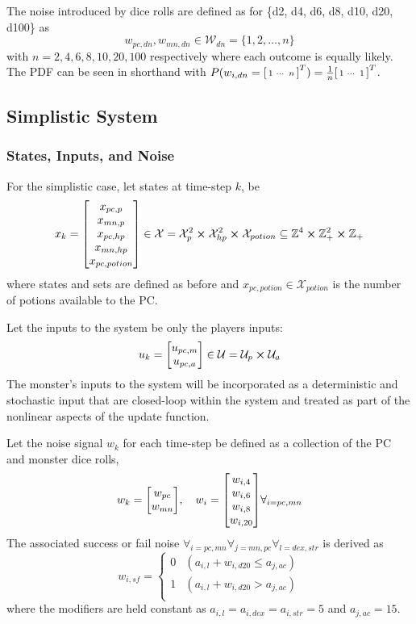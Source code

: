 \documentclass[letterpaper, 10 pt, conference]{ieeeconf}
\newcommand{\Z}{\mathbb{Z}}
\begin{document}
The noise introduced by dice rolls are defined as for \{d2, d4, d6, d8, d10, d20, d100\} as 
\[
    w_{pc,dn}, w_{mn,dn} \in \mathcal{W}_{dn} = \{1,2,\dots,n\}
\] with $n = 2,4,6,8,10,20,100$ respectively where each outcome is equally likely.
The PDF can be seen in shorthand with $P(w_{i,dn} = \smqty[1 & \cdots & n]^T) = \frac{1}{n}\smqty[1 & \cdots & 1]^T$.
% 
\subsection{Simplistic System}
\subsubsection{States, Inputs, and Noise}
For the simplistic case, let states at time-step $k$, be \[
    x_k = \mqty[x_{pc,p}\\x_{mn,p}\\x_{pc,hp}\\x_{mn,hp}\\ x_{pc,potion}] 
    \in \mathcal{X} = \mathcal{X}_p^2 \cross \mathcal{X}_{hp}^2 \cross \mathcal{X}_{potion}
    \subseteq \Z^{4} \cross \Z_{+}^{2} \cross \Z_{+}
\] where states and sets are defined as before and $x_{pc,potion} \in \mathcal{X}_{potion}$ is the number of potions available to the PC.

Let the inputs to the system be only the players inputs: \[
    u_k = \mqty[u_{pc,m}\\u_{pc,a}] \in \mathcal{U} = \mathcal{U}_{p} \cross \mathcal{U}_{a} %
\] The monster's inputs to the system will be incorporated as a deterministic and stochastic input that are closed-loop within the system and treated as part of the nonlinear aspects of the update function.

Let the noise signal $w_k$ for each time-step be defined as a collection of the PC and monster dice rolls, \[
    w_k = \mqty[w_{pc} \\ w_{mn}], \quad w_{i} = \mqty[w_{i,4} \\ w_{i,6} \\ w_{i,8} \\ w_{i,20}] \forall_{i = pc,mn}
\]
The associated success or fail noise $\forall_{i=pc,mn} \forall_{j=mn,pc} \forall_{l = dex,str}$ is derived as \[
    w_{i,sf} = \begin{cases}
        0 & (a_{i,l} + w_{i,d20} \leq a_{j,ac})\\
        1 & (a_{i,l} + w_{i,d20} > a_{j,ac})\\
    \end{cases}
\] where the modifiers are held constant as $a_{i,l} = a_{i,dex} = a_{i,str} = 5$ and $a_{j,ac} = 15$.
\end{document}
